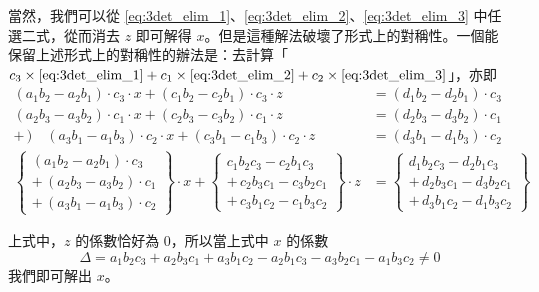 當然，我們可以從 \eqref{eq:3det_elim_1}、\eqref{eq:3det_elim_2}、\eqref{eq:3det_elim_3} 中任選二式，從而消去 $z$ 即可解得 $x$。但是這種解法破壞了形式上的對稱性。一個能保留上述形式上的對稱性的辦法是：去計算「$c_3 \times \eqref{eq:3det_elim_1} + c_1 \times \eqref{eq:3det_elim_2} + c_2 \times \eqref{eq:3det_elim_3}$」，亦即
\begin{align*}
  (a_1 b_2 - a_2 b_1) \cdot c_3 \cdot x + (c_1 b_2 - c_2 b_1) \cdot c_3 \cdot z &= (d_1 b_2 - d_2 b_1) \cdot c_3 \\
  (a_2 b_3 - a_3 b_2) \cdot c_1 \cdot x + (c_2 b_3 - c_3 b_2) \cdot c_1 \cdot z &= (d_2 b_3 - d_3 b_2) \cdot c_1 \\
  +\,) \quad (a_3 b_1 - a_1 b_3) \cdot c_2 \cdot x + (c_3 b_1 - c_1 b_3) \cdot c_2 \cdot z &= (d_3 b_1 - d_1 b_3) \cdot c_2 \\ \hline
  \left\{ \begin{aligned}
    (a_1 b_2 - a_2 b_1) \cdot c_3 \\
    +\, (a_2 b_3 - a_3 b_2) \cdot c_1 \\
    +\, (a_3 b_1 - a_1 b_3) \cdot c_2
  \end{aligned} \right\} \cdot x
  + \left\{ \begin{aligned}
    c_1 b_2 c_3 - c_2 b_1 c_3 \\
    +\, c_2 b_3 c_1 - c_3 b_2 c_1 \\
    +\, c_3 b_1 c_2 - c_1 b_3 c_2
  \end{aligned} \right\} \cdot z
  &= \left\{ \begin{aligned}
    d_1 b_2 c_3 - d_2 b_1 c_3 \\
    +\, d_2 b_3 c_1 - d_3 b_2 c_1 \\
    +\, d_3 b_1 c_2 - d_1 b_3 c_2
  \end{aligned} \right\} \label{eq:3det_sum_master}
\end{align*}

上式中，$z$ 的係數恰好為 $0$，所以當上式中 $x$ 的係數
\begin{equation*}
  \Delta = a_1 b_2 c_3 + a_2 b_3 c_1 + a_3 b_1 c_2 - a_2 b_1 c_3 - a_3 b_2 c_1 - a_1 b_3 c_2 \neq 0
\end{equation*}
我們即可解出 $x$。

